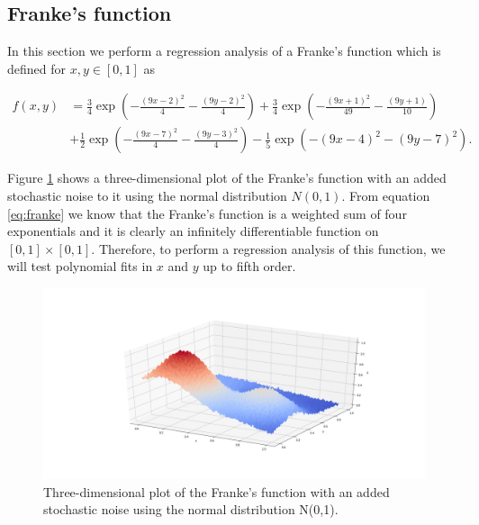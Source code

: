 \documentclass [11pt]{article}
\begin{document}
\subsection{Franke's function}
\label{sebsec:franke}
In this section we perform a regression analysis of a Franke's function which is defined for $x,y\in [0,1]$ as

\begin{align}
f(x,y) &= \frac{3}{4}\exp{\left(-\frac{(9x-2)^2}{4} - \frac{(9y-2)^2}{4}\right)}+\frac{3}{4}\exp{\left(-\frac{(9x+1)^2}{49}- \frac{(9y+1)}{10}\right)} \\
&+\frac{1}{2}\exp{\left(-\frac{(9x-7)^2}{4} - \frac{(9y-3)^2}{4}\right)} -\frac{1}{5}\exp{\left(-(9x-4)^2 - (9y-7)^2\right) }.
\label{eq:franke}
\end{align}

Figure \ref{fig:Franke} shows a three-dimensional plot of the Franke's function with an added stochastic noise to it using  the normal distribution $N(0,1)$. From equation \eqref{eq:franke} we know that the Franke's function is a weighted sum of four exponentials and it is clearly an infinitely differentiable function on $[0,1] \times [0,1]$. Therefore, to perform a regression analysis of this function, we will test
polynomial fits in $x$ and $y$ up to fifth order.
\begin{figure}[H]
\centering
\includegraphics[width=1\textwidth]{figures/Franke.png}
        \caption{Three-dimensional plot of the Franke’s function with an added stochastic noise using the normal distribution N(0,1).}
        \label{fig:Franke}
\end{figure}
\end{document}
